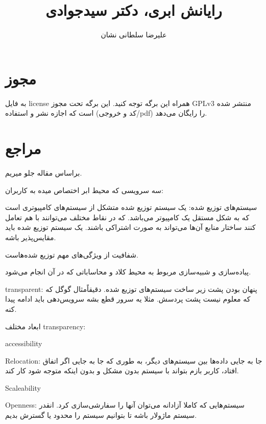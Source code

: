 \documentclass[a4paper]{article}
\title{رایانش ابری، دکتر سیدجوادی}
\author{علیرضا سلطانی نشان}
\begin{document}
\maketitle
\tableofcontents

\section{مجوز}

به فایل license همراه این برگه توجه کنید. این برگه تحت مجوز GPLv3 منتشر شده است
که اجازه نشر و استفاده (کد و خروجی/pdf) را رایگان می‌دهد.

\section{مراجع}

براساس مقاله جلو میریم.

سه سرویسی که محیط ابر اختصاص میده به کاربران:

سیستم‌های توزیع شده: یک سیستم توزیع شده متشکل از سیستم‌های کامپیوتری است که به
شکل مستقل یک کامپیوتر می‌باشد. که در نقاط مختلف می‌توانند با هم تعامل کنند
ساختار منابع آن‌ها می‌تواند به صورت اشتراکی باشند. یک سیستم توزیع شده باید
مقایس‌پذیر باشه.

شفافیت از ویژگی‌های مهم توزیع شده‌هاست.


پیاده‌سازی و شبیه‌سازی مربوط به محیط کلاد و محاساباتی که در آن انجام می‌شود.

transparent: پنهان بودن پشت زیر ساخت سیستم‌های توزیع شده. دقیقاً‌مثال گوگل که که
معلوم نیست پشت پردسش. مثلا یه سرور قطع بشه سرویس‌دهی باید ادامه پیدا کنه.

ابعاد مختلف transparency:

accessibility

Relocation: جا به جایی داده‌ها بین سیستم‌های دیگر، به طوری که جا به جایی اگر
اتفاق افتاد، کاربر بازم بتواند با سیستم بدون مشکل و بدون اینکه متوجه شود کار
کند.

Scaleability

Openness: سیستم‌هایی که کاملا آزادانه می‌توان آنها را سفارشی‌سازی کرد. انقدر
سیستم ماژولار باشه تا بتوانیم سیستم را محدود یا گسترش بدیم.
\end{document}
